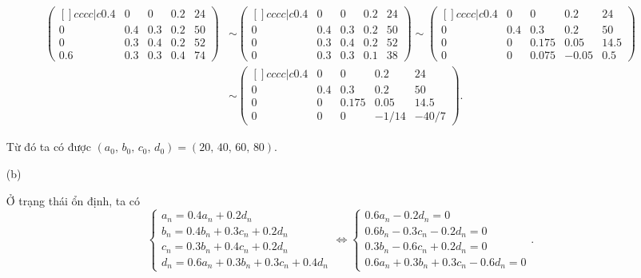 \begin{enumerate}
{        \begin{align*}
            \begin{pmatrix}[]{cccc|c}
                0.4 & 0 & 0 & 0.2 & 24 \\
                0 & 0.4 & 0.3 & 0.2 & 50 \\
                0 & 0.3 & 0.4 & 0.2 & 52 \\
                0.6 & 0.3 & 0.3 & 0.4 & 74 
            \end{pmatrix} & \sim \begin{pmatrix}[]{cccc|c}
                0.4 & 0 & 0 & 0.2 & 24 \\
                0 & 0.4 & 0.3 & 0.2 & 50 \\
                0 & 0.3 & 0.4 & 0.2 & 52 \\
                0 & 0.3 & 0.3 & 0.1 & 38 
            \end{pmatrix} \sim \begin{pmatrix}[]{cccc|c}
                0.4 & 0 & 0 & 0.2 & 24 \\
                0 & 0.4 & 0.3 & 0.2 & 50 \\
                0 & 0 & 0.175 & 0.05 & 14.5 \\
                0 & 0 & 0.075 & -0.05 & 0.5 
            \end{pmatrix} \\ & \sim \begin{pmatrix}[]{cccc|c}
                0.4 & 0 & 0 & 0.2 & 24 \\
                0 & 0.4 & 0.3 & 0.2 & 50 \\
                0 & 0 & 0.175 & 0.05 & 14.5 \\
                0 & 0 & 0 & -1/14 & -40/7 
            \end{pmatrix}.
        \end{align*}

        Từ đó ta có được $(a_0,\,b_0,\,c_0,\,d_0) = (20,\,40,\,60,\,80)$.
    }
    \item[(b)] {Ở trạng thái ổn định, ta có $$\begin{cases}
        a_{n} = 0.4a_n + 0.2d_n \\
        b_{n} = 0.4b_n + 0.3c_n + 0.2d_n \\
        c_{n} = 0.3b_n + 0.4c_n + 0.2d_n \\
        d_{n} = 0.6a_n + 0.3b_n + 0.3c_n + 0.4d_n 
    \end{cases} \iff \begin{cases}
        0.6a_n - 0.2d_n = 0 \\
        0.6b_n - 0.3c_n - 0.2d_n = 0 \\
        0.3b_n - 0.6c_n + 0.2d_n = 0 \\
        0.6a_n + 0.3b_n + 0.3c_n - 0.6d_n = 0
    \end{cases}.$$
    
}
\end{enumerate}
